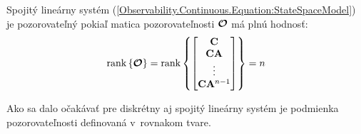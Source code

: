 \documentclass[a4paper, 10pt, ]{article}
\begin{document}
\begin{theorem}
    Spojitý lineárny systém (\ref{Observability.Continuous.Equation:StateSpaceModel}) je pozorovateľný pokiaľ matica pozorovateľnosti $\boldsymbol{\mathcal{O}}$ má plnú hodnosť:
    \begin{equation}
        \label{Observability.Continuous.Equation:ObservabilityTheorem}
        \mathrm{rank} \left\{ \boldsymbol{\mathcal{O}} \right\} = 
        \mathrm{rank} \left\{
            \begin{bmatrix}
                \mathbf{C}                \\
                \mathbf{C} \mathbf{A}         \\
                \vdots                \\
                \mathbf{C} \mathbf{A}^{n - 1} \\
            \end{bmatrix}
        \right\} = 
        n
    \end{equation}
\end{theorem}

Ako sa dalo očakávať pre diskrétny aj spojitý lineárny systém je podmienka pozorovateľnosti definovaná v~rovnakom tvare.
\end{document}

